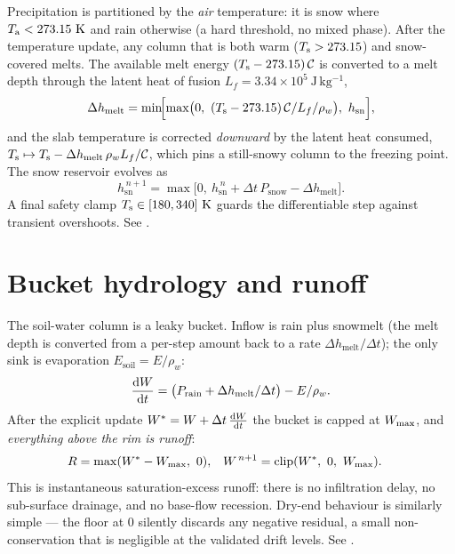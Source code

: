 Precipitation is partitioned by the \emph{air} temperature: it is snow where
$\Tair<273.15\ \mathrm{K}$ and rain otherwise (a hard threshold, no mixed
phase). After the temperature update, any column that is both warm
($T_{\mathrm s}>273.15$) and snow-covered melts. The available melt energy
$(T_{\mathrm s}-273.15)\,\mathcal{C}$ is converted to a melt depth through the latent
heat of fusion $L_f = 3.34\times10^{5}\ \mathrm{J\,kg^{-1}}$,
\begin{equation}
  \Delta h_{\mathrm{melt}} =
  \min\!\Bigl[\max\bigl(0,\ (\Tsfc-273.15)\,\mathcal{C}/L_f/\rho_w\bigr),\ h_{\mathrm{sn}}\Bigr],
\end{equation}
and the slab temperature is corrected \emph{downward} by the latent heat
consumed, $T_{\mathrm s} \mapsto T_{\mathrm s} - \Delta h_{\mathrm{melt}}\,\rho_w L_f/\mathcal{C}$,
which pins a still-snowy column to the freezing point. The snow reservoir
evolves as
\begin{equation}
  h_{\mathrm{sn}}^{\,n+1} = \max\!\bigl[0,\ h_{\mathrm{sn}}^{\,n}
                            + \Delta t\,P_{\mathrm{snow}} - \Delta h_{\mathrm{melt}}\bigr].
\end{equation}
A final safety clamp $\Tsfc\in[180,340]\ \mathrm{K}$ guards the differentiable
step against transient overshoots. See
.

\section{Bucket hydrology and runoff}\label{sec:bucket}

The soil-water column is a leaky bucket. Inflow is rain plus snowmelt (the melt
depth is converted from a per-step amount back to a rate $\Delta
h_{\mathrm{melt}}/\Delta t$); the only sink is evaporation
$E_{\mathrm{soil}}=E/\rho_w$:
\begin{equation}
  \frac{\mathrm{d}W}{\mathrm{d}t} = \bigl(P_{\mathrm{rain}} + \Delta h_{\mathrm{melt}}/\Delta t\bigr) - E/\rho_w.
  \label{eq:bucket}
\end{equation}
After the explicit update $W^\ast = W + \Delta t\,\frac{\mathrm{d}W}{\mathrm{d}t}$ the
bucket is capped at $W_{\max}$, and \emph{everything above the rim is runoff}:
\begin{align}
  R &= \max(W^\ast - W_{\max},\ 0), &
  W^{\,n+1} &= \mathrm{clip}(W^\ast,\ 0,\ W_{\max}).
  \label{eq:runoff}
\end{align}
This is instantaneous saturation-excess runoff: there is no infiltration delay,
no sub-surface drainage, and no base-flow recession. Dry-end behaviour is
similarly simple --- the floor at $0$ silently discards any negative residual,
a small non-conservation that is negligible at the validated drift levels.
See .

